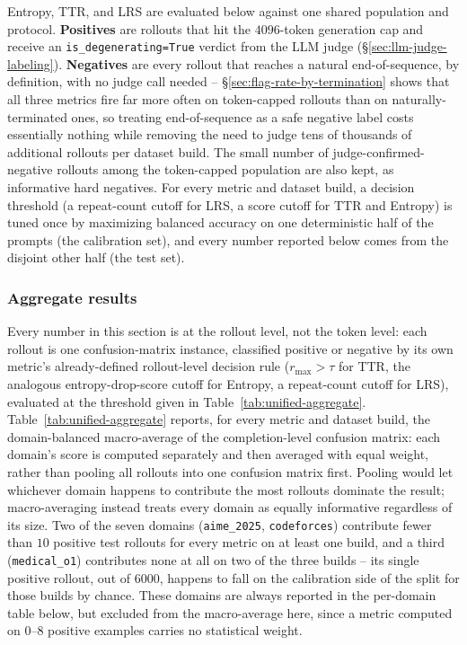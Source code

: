 \documentclass{article}
\begin{document}
Entropy, TTR, and LRS are evaluated below against one shared population and
protocol. \textbf{Positives} are rollouts that hit the $4096$-token
generation cap and receive an \texttt{is\_degenerating=True} verdict from
the LLM judge (\S\ref{sec:llm-judge-labeling}). \textbf{Negatives} are every
rollout that reaches a natural end-of-sequence, by definition, with no
judge call needed -- \S\ref{sec:flag-rate-by-termination} shows that all
three metrics fire far more often on token-capped rollouts than on
naturally-terminated ones, so treating end-of-sequence as a safe negative
label costs essentially nothing while removing the need to judge tens of
thousands of additional rollouts per dataset build. The small number of
judge-confirmed-negative rollouts among the token-capped population are
also kept, as informative hard negatives. For every metric and dataset
build, a decision threshold (a repeat-count cutoff for LRS, a score cutoff
for TTR and Entropy) is tuned once by maximizing balanced accuracy on one
deterministic half of the prompts (the calibration set), and every number
reported below comes from the disjoint other half (the test set).

\subsubsection{Aggregate results}

Every number in this section is at the rollout level, not the token level:
each rollout is one confusion-matrix instance, classified positive or
negative by its own metric's already-defined rollout-level decision rule
($r_{\max}>\tau$ for TTR, the analogous entropy-drop-score cutoff for
Entropy, a repeat-count cutoff for LRS), evaluated at the threshold given
in Table~\ref{tab:unified-aggregate}. Table~\ref{tab:unified-aggregate}
reports, for every metric and dataset
build, the domain-balanced macro-average of the completion-level confusion
matrix: each domain's score is computed separately and then averaged with
equal weight, rather than pooling all rollouts into one confusion matrix
first. Pooling would let whichever domain happens to contribute the most
rollouts dominate the result; macro-averaging instead treats every domain
as equally informative regardless of its size. Two of the seven domains
(\texttt{aime\_2025},
\texttt{codeforces}) contribute fewer than $10$ positive test rollouts for
every metric on at least one build, and a third (\texttt{medical\_o1})
contributes none at all on two of the three builds -- its single positive
rollout, out of $6000$, happens to fall on the calibration side of the
split for those builds by chance. These domains are always reported in the
per-domain table below, but excluded from the macro-average here, since a
metric computed on $0$--$8$ positive examples carries no statistical
weight.
\end{document}
